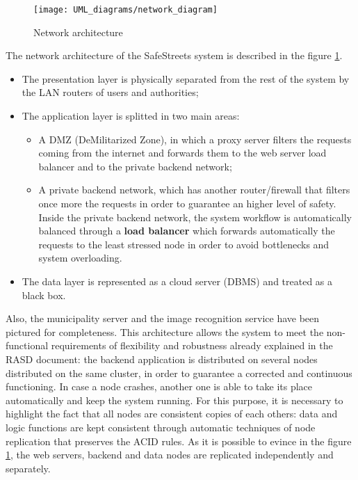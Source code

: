\begin{figure}[H]
    \centering
    \texttt{[image: UML\_diagrams/network\_diagram]}
    \caption{Network architecture}
    \label{fig:network_diagram}
\end{figure}
The network architecture of the SafeStreets system is described in the figure \ref{fig:network_diagram}. 
\begin{itemize}
    \item The presentation layer is physically separated from the rest of the system by the LAN routers of users and authorities;
    \item The application layer is splitted in two main areas: 
        \begin{itemize}
            \item A DMZ (DeMilitarized Zone), in which a proxy server filters the requests coming from the internet and forwards them to the web server load balancer and to the private backend network;
            \item A private backend network, which has another router/firewall that filters once more the requests in order to guarantee an higher level of safety. Inside the private backend network, the system workflow is automatically balanced through a \textbf{load balancer} which forwards automatically the requests to the least stressed node in order to avoid bottlenecks and system overloading.
        \end{itemize}
    \item The data layer is represented as a cloud server (DBMS) and treated as a black box.
\end{itemize}
Also, the municipality server and the image recognition service have been pictured for completeness.\newline
This architecture allows the system to meet the non-functional requirements of flexibility and robustness already explained in the RASD document: 
the backend application is distributed on several nodes distributed on the same cluster, in order to guarantee a corrected and continuous functioning. In case a node crashes, another one is able to take its place automatically and keep the system running. For this purpose, it is necessary to highlight the fact that all nodes are consistent copies of each others: data and logic functions are kept consistent through automatic techniques of node replication that preserves the ACID rules.  
\newline As it is possible to evince in the figure \ref{fig:network_diagram}, the web servers, backend and data nodes are replicated independently and separately.
